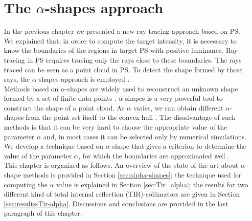 \chapter{The $\alpha$-shapes approach}\label{chap:boundaries_alpha}
In the previous chapter we presented a new ray tracing approach based on PS. We explained that, in order to compute the target intensity, it is necessary to know the boundaries of the regions in target PS with positive luminance. Ray tracing in PS requires tracing only the rays close to these boundaries. The rays traced can be seen as a point cloud in PS. To detect the shape formed by those rays, the $\alpha$-shapes approach is employed \cite{portegies2013fast}.\\ \indent
Methods based on $\alpha$-shapes are widely used to reconstruct an unknown shape formed by a set of finite data points \cite{guo1997surface}. $\alpha$-shapes is a very powerful tool to construct the shape of a point cloud. As $\alpha$ varies, we can obtain different $\alpha$-shapes from the point set itself to the convex
hull \cite{xu2003automatic}. The disadvantage of such methods is that it can be very hard to choose the appropriate value of the parameter $\alpha$ and, in most cases it can be selected only by numerical simulations.\\ \indent
We develop a technique based on $\alpha$-shape that gives a criterion to determine the value of the parameter $\alpha$, for which the boundaries are approximated well \cite{filosa2015new}.\\ \indent This chapter is organized as follows. An overview of the-state-of-the-art about $\alpha$-shape methods is provided in Section \ref{sec:alpha-shapes}; the technique used for computing the $\alpha$ value is explained in Section \ref{sec:Tir_alpha}; the results for two different kind of total internal reflection (TIR)-collimators are given in Section \ref{sec:results-Tir-alpha}. Discussions and conclusions are provided in the last paragraph of this chapter.
